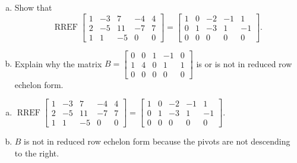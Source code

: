 
\begin{exerciseStatement}

\begin{enumerate}[(a)]
\item Show that \[\operatorname{RREF} \left[\begin{array}{ccccc}
1 & -3 & 7 & -4 & 4 \\
2 & -5 & 11 & -7 & 7 \\
1 & 1 & -5 & 0 & 0
\end{array}\right] = \left[\begin{array}{ccccc}
1 & 0 & -2 & -1 & 1 \\
0 & 1 & -3 & 1 & -1 \\
0 & 0 & 0 & 0 & 0
\end{array}\right] .\]
\item Explain why the matrix \(B= \left[\begin{array}{ccccc}
0 & 0 & 1 & -1 & 0 \\
1 & 4 & 0 & 1 & 1 \\
0 & 0 & 0 & 0 & 0
\end{array}\right] \) is or is not in reduced row echelon form.
\end{enumerate}
    
\end{exerciseStatement}
    
\begin{exerciseAnswer} 

\begin{enumerate}[(a)]
\item \(\operatorname{RREF} \left[\begin{array}{ccccc}
1 & -3 & 7 & -4 & 4 \\
2 & -5 & 11 & -7 & 7 \\
1 & 1 & -5 & 0 & 0
\end{array}\right] = \left[\begin{array}{ccccc}
1 & 0 & -2 & -1 & 1 \\
0 & 1 & -3 & 1 & -1 \\
0 & 0 & 0 & 0 & 0
\end{array}\right] .\)
\item \(B\) is not in reduced row echelon form because the pivots are not descending to the right. 
\end{enumerate}
    
\end{exerciseAnswer}
    
